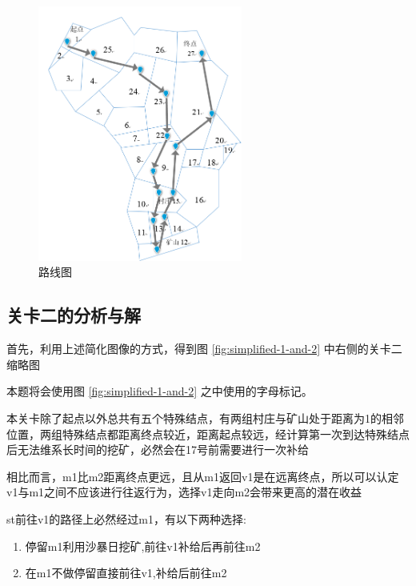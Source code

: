 \documentclass[a4paper]{ctexart}
\begin{document}
\begin{figure}[htpb]
    \centering
    \includegraphics[width=0.6\textwidth]{./pictures/route.jpg}
    \caption{路线图}
    \label{fig:./pictures/route.jpg}
\end{figure}

\subsection{关卡二的分析与解}

首先，利用上述简化图像的方式，得到图 \ref{fig:simplified-1-and-2} 中右侧的关卡二缩略图

本题将会使用图 \ref{fig:simplified-1-and-2} 之中使用的字母标记。

本关卡除了起点以外总共有五个特殊结点，有两组村庄与矿山处于距离为1的相邻位置，两组特殊结点都距离终点较近，距离起点较远，经计算第一次到达特殊结点后无法维系长时间的挖矿，必然会在17号前需要进行一次补给

相比而言，m1比m2距离终点更远，且从m1返回v1是在远离终点，所以可以认定v1与m1之间不应该进行往返行为，选择v1走向m2会带来更高的潜在收益

st前往v1的路径上必然经过m1，有以下两种选择:

\begin{enumerate}
    \item 停留m1利用沙暴日挖矿,前往v1补给后再前往m2
    \item 在m1不做停留直接前往v1,补给后前往m2
\end{enumerate}
\end{document}
